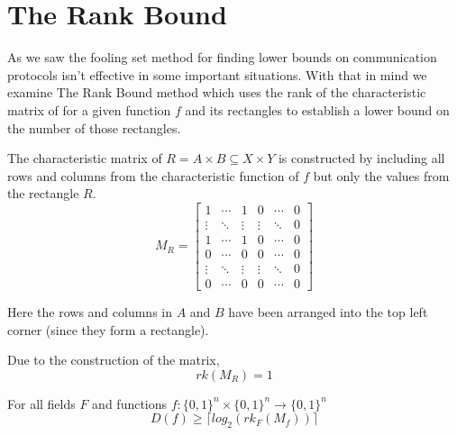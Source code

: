 \documentclass[usletter]{article}
\begin{document}
\section{The Rank Bound} \label{sec:rank-bound}

As we saw the fooling set method for finding lower bounds on communication protocols isn't effective in some important situations. With that in mind we examine The Rank Bound method which uses the rank of the characteristic matrix of for a given function $f$ and its rectangles to establish a lower bound on the number of those rectangles.

\begin{definition}
  The characteristic matrix of $R = A \times B \subseteq X \times Y$ is constructed by including all rows and columns from the characteristic function of $f$ but only the values from the rectangle $R$.
  \begin{equation*}
    M_R =
    \begin{bmatrix}
      1 & \cdots & 1 & 0 & \cdots & 0 \\
      \vdots & \ddots & \vdots & \vdots & \ddots & 0 \\
      1 & \cdots & 1 & 0 & \cdots & 0 \\
      0 & \cdots & 0 & 0 & \cdots & 0 \\
      \vdots & \ddots & \vdots & \vdots & \ddots & 0 \\
      0 & \cdots & 0 & 0 & \cdots & 0
    \end{bmatrix}
  \end{equation*}

Here the rows and columns in $A$ and $B$ have been arranged into the top left corner (since they form a rectangle).
\end{definition}

\begin{fact}
 Due to the construction of the matrix,
  \begin{equation*}
    rk(M_R) = 1
  \end{equation*}
\end{fact}

\begin{theorem}
  For all fields $F$ and functions $f : \{0,1\}^n \times \{0,1\}^n \rightarrow \{0,1\}^n $
  \begin{equation*}
    D(f) \geq \lceil log_2(rk_{F}(M_f)) \rceil
  \end{equation*}
\end{theorem}
\end{document}
